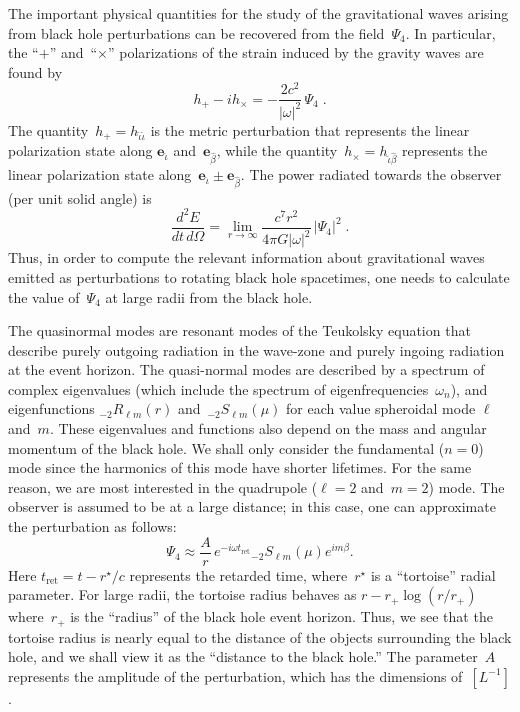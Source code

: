 The important physical quantities for the study of the gravitational
waves arising from black hole perturbations can be recovered from the
field~$\Psi_4$.  In particular, the ``$+$'' and~``$\times$'' polarizations
of the strain induced by the gravity waves are found
by~\cite{teukolsky:1973}
\begin{equation}
  h_+ - ih_\times = -\frac{2c^2}{|\omega|^2}\,\Psi_4\;.
  \label{e:perturbation strain}
\end{equation}
The quantity~$h_+=h_{\hat\iota\hat\iota}$ is the metric perturbation
that represents the linear polarization state along
${\mathbf{e}}_{\hat\iota}$ and~${\mathbf{e}}_{\hat\beta}$, while the
quantity~$h_\times=h_{\hat\iota\hat\beta}$ represents the linear
polarization state
along~${\mathbf{e}}_{\hat\iota}\pm{\mathbf{e}}_{\hat\beta}$.  The power
radiated towards the observer (per unit solid angle) is
\begin{equation}
  \frac{d^2E}{dt\,d\Omega} = \lim_{r\to\infty}
  \frac{c^7r^2}{4\pi G|\omega|^2} \, |\Psi_4|^2\;.
  \label{e:perturbation power}
\end{equation}
Thus, in order to compute the relevant information about gravitational
waves emitted as perturbations to rotating black hole spacetimes, one
needs to calculate the value of~$\Psi_4$ at large radii from the black hole.

The quasinormal modes are resonant modes of the Teukolsky equation
that describe purely outgoing radiation in the wave-zone and purely
ingoing radiation at the event horizon.  The quasi-normal modes are
described by a spectrum of complex eigenvalues (which include the
spectrum of eigenfrequencies~$\omega_n$), and
eigenfunctions ${}_{-2}R_{\ell m}(r)$
and~${}_{-2}S_{\ell m}(\mu)$ for each value spheroidal mode $\ell$
and~$m$.  These eigenvalues and functions also depend on the mass and
angular momentum of the black hole.  We shall only consider
the fundamental ($n=0$) mode since the harmonics of this mode have
shorter lifetimes.  For the same reason, we are most interested in the
quadrupole ($\ell=2$ and~$m=2$) mode.  The observer is assumed to be at a large
distance; in this case, one can approximate the perturbation as follows:
\begin{equation}
  \Psi_4 \approx \frac{A}{r}\,e^{-i\omega t_{\mathrm{\scriptscriptstyle ret}}}
    {}_{-2}S_{\ell m}(\mu)e^{im\beta}.
  \label{e:asymp perturbation}
\end{equation}
Here $t_{\mathrm{\scriptstyle ret}}=t-r^\star/c$ represents the retarded time,
where~$r^\star$ is a ``tortoise'' radial parameter.  For large radii, the
tortoise radius behaves as $r-r_+\log(r/r_+)$ where~$r_+$ is the ``radius''
of the black hole event horizon.  Thus, we see that the tortoise radius is
nearly equal to the distance of the objects surrounding the black hole,
and we shall view it as the ``distance to the black hole.''  The
parameter~$A$ represents the amplitude of the perturbation, which has the
dimensions of~$[L^{-1}]$.


